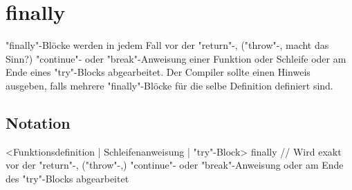 \chapter{finally}

"finally"-Blöcke werden in jedem Fall vor der "return"-, ("throw"-, macht das Sinn?)  "continue"- oder "break"-Anweisung einer Funktion oder Schleife oder
am Ende eines "try"-Blocks abgearbeitet.
Der Compiler sollte einen Hinweis ausgeben, falls mehrere "finally"-Blöcke für die selbe Definition definiert sind.

\section{Notation}
<Funktionsdefinition | Schleifenanweisung | "try"-Block>
finally // Wird exakt vor der "return"-, ("throw"-,) "continue"- oder "break"-Anweisung oder am Ende des "try"-Blocks abgearbeitet
{
}

